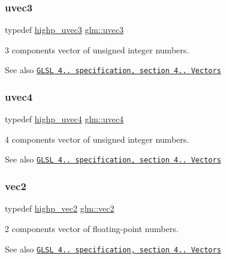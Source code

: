 \subsubsection{\texorpdfstring{uvec3}{uvec3}}
{\footnotesize\ttfamily typedef \hyperlink{group__core__precision_ga2e16953ad75ce0c6d7faa921ca006ce5}{highp\+\_\+uvec3} \hyperlink{group__core__types_gac4ba593917841b859ba1683b8b52b8fa}{glm\+::uvec3}}

3 components vector of unsigned integer numbers.

\begin{DoxySeeAlso}{See also}
\href{http://www.opengl.org/registry/doc/GLSLangSpec.4.20.8.pdf}{\tt G\+L\+SL 4.. specification, section 4.. Vectors} 
\end{DoxySeeAlso}
\mbox{\label{group__core__types_ga1c426d19627b32b14f0089f7f4ba7b1d}} 
\subsubsection{\texorpdfstring{uvec4}{uvec4}}
{\footnotesize\ttfamily typedef \hyperlink{group__core__precision_gae48d6e9a99afc33e6fa51e5d576dfd1a}{highp\+\_\+uvec4} \hyperlink{group__core__types_ga1c426d19627b32b14f0089f7f4ba7b1d}{glm\+::uvec4}}

4 components vector of unsigned integer numbers.

\begin{DoxySeeAlso}{See also}
\href{http://www.opengl.org/registry/doc/GLSLangSpec.4.20.8.pdf}{\tt G\+L\+SL 4.. specification, section 4.. Vectors} 
\end{DoxySeeAlso}
\mbox{\label{group__core__types_gaa1618f51db67eaa145db101d8c8431d8}} 
\subsubsection{\texorpdfstring{vec2}{vec2}}
{\footnotesize\ttfamily typedef \hyperlink{group__core__precision_gad588ab946806864499d6559c186ce3ba}{highp\+\_\+vec2} \hyperlink{group__core__types_gaa1618f51db67eaa145db101d8c8431d8}{glm\+::vec2}}

2 components vector of floating-\/point numbers.

\begin{DoxySeeAlso}{See also}
\href{http://www.opengl.org/registry/doc/GLSLangSpec.4.20.8.pdf}{\tt G\+L\+SL 4.. specification, section 4.. Vectors} 
\end{DoxySeeAlso}
\mbox{\label{group__core__types_ga1c47e8b3386109bc992b6c48e91b0be7}} 
